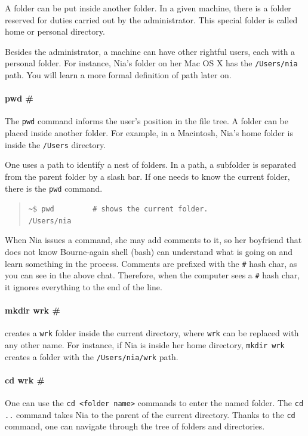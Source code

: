 \documentclass[a4paper,12pt]{book}
\begin{document}
A folder can be put inside another folder.
In a given machine, there is a folder 
reserved for duties carried out by the
administrator.
This special folder is called home
or personal directory.

Besides the administrator, a machine can
have other rightful users, each with
a personal folder. For instance, Nia's folder
on her Mac OS X has the \verb|/Users/nia|
path. You will learn a more formal
definition of path later on.


\paragraph{pwd \#} 
The \verb|pwd| command informs
the user's position in the file tree.
A folder can be placed
inside another folder.
For example, in a Macintosh, Nia's home
folder is inside the \verb|/Users| directory.

One uses a path to identify
a nest of folders. In a path, a subfolder
is separated from the parent folder
by a slash bar. If one needs to know
the current folder, there is the \verb|pwd|
command. 
\begin{quote}
\verb|~$ pwd         # shows the current folder. |\\
\verb|/Users/nia|\\
\end{quote}
When Nia issues a command, she may
add comments to it, so her boyfriend that
does not know Bourne-again shell (bash)
can understand what
is going on and learn something in
the process. Comments are prefixed
with the \verb|#| hash char, as you
can see in the above chat. Therefore,
when the computer sees a \verb|#|
hash char, it ignores everything to
the end of the line.

\paragraph{mkdir wrk \#}
creates a \verb|wrk|
folder inside the current directory,
where \verb|wrk| can be replaced
with any other name.
For instance, if Nia is inside her
home directory, \verb|mkdir wrk| creates
a folder with the \verb|/Users/nia/wrk| path.

\paragraph{cd wrk \#} 
One can use the
\verb|cd <folder name>| commands to enter
the named folder.
The \verb|cd ..|  command
takes Nia to the parent of the current
directory.
Thanks to the \verb|cd|
command, one can navigate through the
tree of folders and directories.
\end{document}
